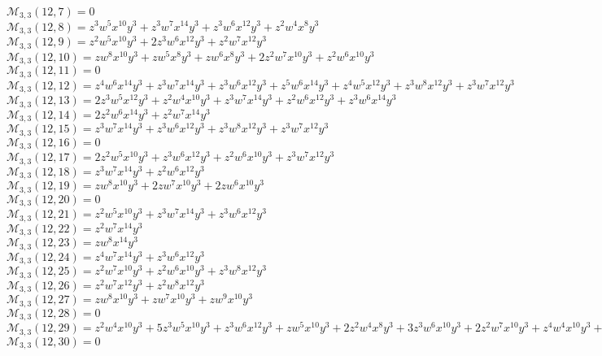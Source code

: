 $\mathcal{M}_{3,3}(12,7)=0$\\
$\mathcal{M}_{3,3}(12,8)=z^3w^5x^{10}y^3+z^3w^7x^{14}y^3+z^3w^6x^{12}y^3+z^2w^4x^8y^3$\\
$\mathcal{M}_{3,3}(12,9)=z^2w^5x^{10}y^3+2z^3w^6x^{12}y^3+z^2w^7x^{12}y^3$\\
$\mathcal{M}_{3,3}(12,10)=zw^8x^{10}y^3+zw^5x^8y^3+zw^6x^8y^3+2z^2w^7x^{10}y^3+z^2w^6x^{10}y^3$\\
$\mathcal{M}_{3,3}(12,11)=0$\\
$\mathcal{M}_{3,3}(12,12)=z^4w^6x^{14}y^3+z^3w^7x^{14}y^3+z^3w^6x^{12}y^3+z^5w^6x^{14}y^3+z^4w^5x^{12}y^3+z^3w^8x^{12}y^3+z^3w^7x^{12}y^3$\\
$\mathcal{M}_{3,3}(12,13)=2z^3w^5x^{12}y^3+z^2w^4x^{10}y^3+z^3w^7x^{14}y^3+z^2w^6x^{12}y^3+z^3w^6x^{14}y^3$\\
$\mathcal{M}_{3,3}(12,14)=2z^2w^6x^{14}y^3+z^2w^7x^{14}y^3$\\
$\mathcal{M}_{3,3}(12,15)=z^3w^7x^{14}y^3+z^3w^6x^{12}y^3+z^3w^8x^{12}y^3+z^3w^7x^{12}y^3$\\
$\mathcal{M}_{3,3}(12,16)=0$\\
$\mathcal{M}_{3,3}(12,17)=2z^2w^5x^{10}y^3+z^3w^6x^{12}y^3+z^2w^6x^{10}y^3+z^3w^7x^{12}y^3$\\
$\mathcal{M}_{3,3}(12,18)=z^3w^7x^{14}y^3+z^2w^6x^{12}y^3$\\
$\mathcal{M}_{3,3}(12,19)=zw^8x^{10}y^3+2zw^7x^{10}y^3+2zw^6x^{10}y^3$\\
$\mathcal{M}_{3,3}(12,20)=0$\\
$\mathcal{M}_{3,3}(12,21)=z^2w^5x^{10}y^3+z^3w^7x^{14}y^3+z^3w^6x^{12}y^3$\\
$\mathcal{M}_{3,3}(12,22)=z^2w^7x^{14}y^3$\\
$\mathcal{M}_{3,3}(12,23)=zw^8x^{14}y^3$\\
$\mathcal{M}_{3,3}(12,24)=z^4w^7x^{14}y^3+z^3w^6x^{12}y^3$\\
$\mathcal{M}_{3,3}(12,25)=z^2w^7x^{10}y^3+z^2w^6x^{10}y^3+z^3w^8x^{12}y^3$\\
$\mathcal{M}_{3,3}(12,26)=z^2w^7x^{12}y^3+z^2w^8x^{12}y^3$\\
$\mathcal{M}_{3,3}(12,27)=zw^8x^{10}y^3+zw^7x^{10}y^3+zw^9x^{10}y^3$\\
$\mathcal{M}_{3,3}(12,28)=0$\\
$\mathcal{M}_{3,3}(12,29)=z^2w^4x^{10}y^3+5z^3w^5x^{10}y^3+z^3w^6x^{12}y^3+zw^5x^{10}y^3+2z^2w^4x^8y^3+3z^3w^6x^{10}y^3+2z^2w^7x^{10}y^3+z^4w^4x^{10}y^3+z^2w^5x^8y^3$\\
$\mathcal{M}_{3,3}(12,30)=0$\\
